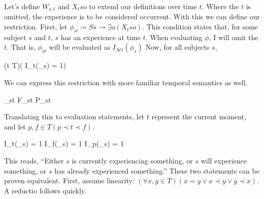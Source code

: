 \documentclass[leqno]{article}
\newcounter{lemma}
\newcommand{\temporaleval}[2]{ I_{\mathcal{M}#1}(#2) }
\begin{document}
	Let's define $W_{s,t}$ and $X_{t}so$ to extend our definitions over time $t$.
	Where the $t$ is omitted, the experience is to be considered occurrent. With
	this we can define our restriction. First, let
	$\phi_{st}\coloneq Ss \rightarrow \exists o(X_{t}so)$. This condition states that,
	for some subject $s$ and $t$, $s$ has an experience at time $t$. When
	evaluating $\phi$, I will omit the $t$. That is, $\phi_{st}$ will be evaluated
	as $\temporaleval{t}{\phi_s}$ Now, for all subjects $s$,
	\begin{lemmalist}
		[WOE.][woe] \label{woe:t1} (\exists t \in T)(\temporaleval{t}{\phi_{s}} = 1)
	\end{lemmalist}
	We can express this restriction with more familiar temporal semantics as well.
	\begin{lemmalist}
		[WOE.][woe] \label{woe:t2} \phi_{st} \lor F\phi_{st} \lor P\phi_{st}
	\end{lemmalist}
	Translating this to evaluation statements, let $t$ represent the current moment,
	and let $p, f \in T (p \prec t \prec f)$.
	\begin{lemmalist}
		[WOE.][woe] \label{woe:t3} \temporaleval{t}{\phi_s} = 1 \lor \temporaleval{f}{\phi_s}
		= 1 \lor \temporaleval{p}{\phi_s} = 1
	\end{lemmalist}
	\noindent
	This reads, \enquote{Either $s$ is currently experiencing something, or $s$ will experience something, or $s$ has already experienced something.}
	These two statements can be proven equivalent. First, assume linearity:
	$(\forall x, y \in T)(x = y \lor x \prec y \lor y \prec x)$. A reductio follows
	quickly.
\end{document}
